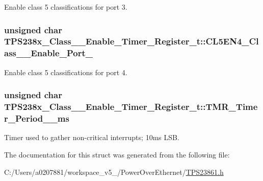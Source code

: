 Enable class 5 classifications for port 3. 

\hypertarget{struct_t_p_s238x___class__5___enable___timer___register__t_a2307507a542fe542038cf803beddde85}{
\subsubsection[{C\-L5\-E\-N4\-\_\-\-Class\-\_\-5\-\_\-\-Enable\-\_\-\-Port\-\_\-4}]{\setlength{\rightskip}{0pt plus 5cm}unsigned char T\-P\-S238x\-\_\-\-Class\-\_\-\_\-\-Enable\-\_\-\-Timer\-\_\-\-Register\-\_\-t\-::\-C\-L5\-E\-N4\-\_\-\-Class\-\_\-\_\-\-Enable\-\_\-\-Port\-\_}}\label{struct_t_p_s238x___class__5___enable___timer___register__t_a2307507a542fe542038cf803beddde85}


Enable class 5 classifications for port 4. 

\hypertarget{struct_t_p_s238x___class__5___enable___timer___register__t_a8a42f6eb2d98cf7325c3814242b3a984}{
\subsubsection[{T\-M\-R\-\_\-\-Timer\-\_\-\-Period\-\_\-10\-\_\-ms}]{\setlength{\rightskip}{0pt plus 5cm}unsigned char T\-P\-S238x\-\_\-\-Class\-\_\-\_\-\-Enable\-\_\-\-Timer\-\_\-\-Register\-\_\-t\-::\-T\-M\-R\-\_\-\-Timer\-\_\-\-Period\-\_\-\_\-ms}}\label{struct_t_p_s238x___class__5___enable___timer___register__t_a8a42f6eb2d98cf7325c3814242b3a984}


Timer used to gather non-\/critical interrupts; 10ms L\-S\-B. 



The documentation for this struct was generated from the following file\-:\begin{DoxyCompactItemize}
\item 
C\-:/\-Users/a0207881/workspace\-\_\-v5\-\_/\-Power\-Over\-Ethernet/\hyperlink{_t_p_s23861_8h}{T\-P\-S23861.\-h}\end{DoxyCompactItemize}
